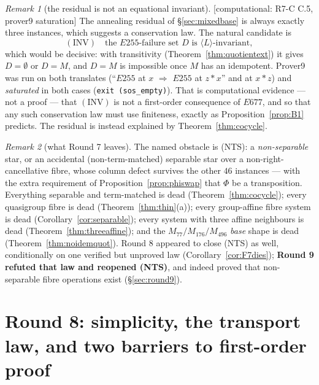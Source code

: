 \documentclass[11pt]{article}
\theoremstyle{plain}
\theoremstyle{definition}
\theoremstyle{remark}
\newtheorem*{remark*}{Remark}
\numberwithin{equation}{section}
\newcommand{\op}{\mathbin{*}}
\newcommand{\statusbox}[1]{{\small\sloppy\textsf{[#1]}}}
\newcommand{\COMP}[1]{\statusbox{computational: #1}}
\begin{document}
\begin{remark*}[the residual is not an equational invariant]
\COMP{R7-C C.5, prover9 saturation}
The annealing residual of \S\ref{sec:mixedbase} is always exactly three
instances, which suggests a conservation law. The natural candidate is
\[
  (\mathrm{INV})\quad \text{the } E255\text{-failure set } D \text{ is }
  \langle L\rangle\text{-invariant},
\]
which would be decisive: with transitivity (Theorem~\ref{thm:quotientext}) it
gives $D = \emptyset$ or $D = M$, and $D = M$ is impossible once $M$ has an
idempotent. Prover9 was run on both translates (``$E255$ at $x$ $\Rightarrow$
$E255$ at $z\op x$'' and at $x\op z$) and \emph{saturated} in both cases
(\texttt{exit (sos\_empty)}). That is computational evidence --- not a proof --- that
$(\mathrm{INV})$ is not a first-order consequence of $E677$, and so that any such
conservation law must use finiteness, exactly as Proposition~\ref{prop:B1} predicts. The residual is instead explained by
Theorem~\ref{thm:cocycle}.
\end{remark*}

\begin{remark*}[what Round 7 leaves]
The named obstacle is (NTS): a \emph{non-separable} star, or an accidental
(non-term-matched) separable star over a non-right-cancellative fibre, whose
column defect survives the other $46$ instances --- with the extra requirement of
Proposition~\ref{prop:phiswap} that $\Phi$ be a transposition. Everything
separable and term-matched is dead (Theorem~\ref{thm:cocycle}); every quasigroup
fibre is dead (Theorem~\ref{thm:thin}(a)); every group-affine fibre system is dead
(Corollary~\ref{cor:separable}); every system with three affine neighbours is dead
(Theorem~\ref{thm:threeaffine}); and the $M_{77}/M_{176}/M_{496}$ \emph{base}
shape is dead (Theorem~\ref{thm:noidemquot}). Round 8 appeared to close (NTS) as
well, conditionally on one verified but unproved law
(Corollary~\ref{cor:F7dies}); \textbf{Round 9 refuted that law and reopened
(NTS)}, and indeed proved that non-separable fibre operations exist
(\S\ref{sec:round9}).
\end{remark*}
\section{Round 8: simplicity, the transport law, and two barriers to
first-order proof}\label{sec:round8}
\end{document}
